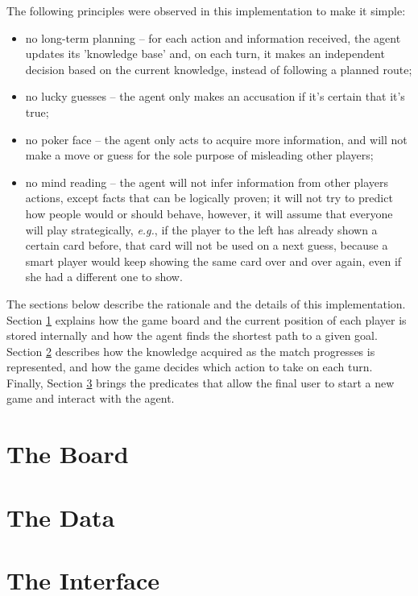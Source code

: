 \documentclass[12pt,a4paper]{article}
\begin{document}
The following principles were observed in this implementation to make it simple:
\begin{itemize}
    \item no long-term planning -- for each action and information received, the agent updates its 'knowledge base' and, on each turn, it makes an independent decision based on the current knowledge, instead of following a planned route;
    
    \item no lucky guesses -- the agent only makes an accusation if it's certain that it's true;
    
    \item no poker face -- the agent only acts to acquire more information, and will not make a move or guess for the sole purpose of misleading other players;
    
    \item no mind reading -- the agent will not infer information from other players actions, except facts that can be logically proven; it will not try to predict how people would or should behave, however, it will assume that everyone will play strategically, \textit{e.g.}, if the player to the left has already shown a certain card before, that card will not be used on a next guess, because a smart player would keep showing the same card over and over again, even if she had a different one to show.
\end{itemize}

The sections below describe the rationale and the details of this implementation. Section \ref{sec:board} explains how the game board and the current position of each player is stored internally and how the agent finds the shortest path to a given goal. Section \ref{sec:data} describes how the knowledge acquired as the match progresses is represented, and how the game decides which action to take on each turn. Finally, Section \ref{sec:interface} brings the predicates that allow the final user to start a new game and interact with the agent.

\section{The Board}
\label{sec:board}

\section{The Data}
\label{sec:data}

\section{The Interface}
\label{sec:interface}
\end{document}
